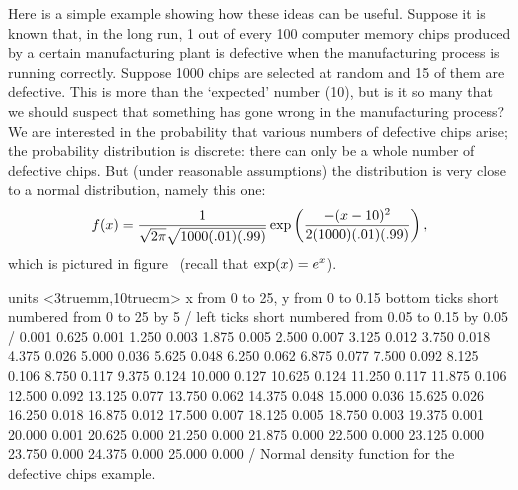 Here is a simple example showing how these ideas can be
useful. Suppose it is known that, in the long run, 1 out of every 100
computer memory chips produced by a certain manufacturing plant is
defective when the manufacturing process is running correctly. Suppose
1000 chips are selected at random and 15 of them are defective. This
is more than the `expected' number (10), but is it so many that we
should suspect that something has gone wrong in the manufacturing
process? We are interested in the probability that various numbers of
defective chips arise; the probability distribution is discrete: there
can only be a whole number of defective chips. But (under reasonable
assumptions) the distribution is very close to a normal
distribution, namely this one:
$$
  f(x)={1\over\sqrt{2\pi}\sqrt{1000(.01)(.99)}}
   \exp\left({-(x-10)^2\over 2(1000)(.01)(.99)}\right),
$$
which is pictured in figure~ 
(recall that $\displaystyle \exp(x)=e^x$). 

\figure
\texonly
\vbox{\beginpicture
\normalgraphs
\ninepoint
\setcoordinatesystem units <3truemm,10truecm>
\setplotarea x from 0 to 25, y from 0 to 0.15
\axis bottom ticks short numbered from 0 to 25 by 5 /
\axis left ticks short numbered from 0.05 to 0.15 by 0.05 /
\setquadratic
{} 0.001 0.625 0.001 1.250 0.003 1.875 0.005 2.500 0.007 
3.125 0.012 3.750 0.018 4.375 0.026 5.000 0.036 5.625 0.048 
6.250 0.062 6.875 0.077 7.500 0.092 8.125 0.106 8.750 0.117 
9.375 0.124 10.000 0.127 10.625 0.124 11.250 0.117 11.875 0.106 
12.500 0.092 13.125 0.077 13.750 0.062 14.375 0.048 15.000 0.036 
15.625 0.026 16.250 0.018 16.875 0.012 17.500 0.007 18.125 0.005 
18.750 0.003 19.375 0.001 20.000 0.001 20.625 0.000 21.250 0.000 
21.875 0.000 22.500 0.000 23.125 0.000 23.750 0.000 24.375 0.000 
25.000 0.000 /
\endpicture}
\endtexonly
{}
\begincaption
Normal density function for the defective chips example.
\endcaption
\endfigure

